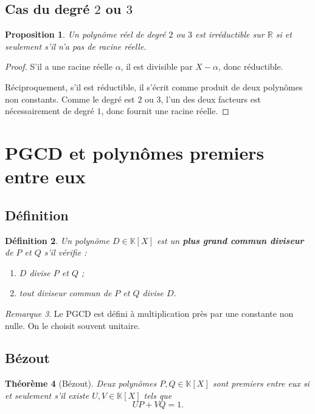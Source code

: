 \documentclass[11pt,a4paper]{article}
\newtheorem{definition}{Définition}[section]
\newtheorem{theoreme}[definition]{Théorème}
\newtheorem{proposition}[definition]{Proposition}
\theoremstyle{remark}
\newtheorem{remarque}[definition]{Remarque}
\newcommand{\R}{\mathbb{R}}
\newcommand{\K}{\mathbb{K}}
\begin{document}
\subsection{Cas du degré \(2\) ou \(3\)}

\begin{proposition}
Un polynôme réel de degré \(2\) ou \(3\) est irréductible sur \(\R\) si et seulement s’il n’a pas de racine réelle.
\end{proposition}

\begin{proof}
S’il a une racine réelle \(\alpha\), il est divisible par \(X-\alpha\), donc réductible.

Réciproquement, s’il est réductible, il s’écrit comme produit de deux polynômes non constants. Comme le degré est \(2\) ou \(3\), l’un des deux facteurs est nécessairement de degré \(1\), donc fournit une racine réelle.
\end{proof}

\section{PGCD et polynômes premiers entre eux}

\subsection{Définition}

\begin{definition}
Un polynôme \(D\in\K[X]\) est un \textbf{plus grand commun diviseur} de \(P\) et \(Q\) s’il vérifie :
\begin{enumerate}[label=\arabic*)]
    \item \(D\) divise \(P\) et \(Q\) ;
    \item tout diviseur commun de \(P\) et \(Q\) divise \(D\).
\end{enumerate}
\end{definition}

\begin{remarque}
Le PGCD est défini à multiplication près par une constante non nulle. On le choisit souvent unitaire.
\end{remarque}

\subsection{Bézout}

\begin{theoreme}[Bézout]
Deux polynômes \(P,Q\in\K[X]\) sont premiers entre eux si et seulement s’il existe \(U,V\in\K[X]\) tels que
\[
UP+VQ=1.
\]
\end{theoreme}
\end{document}
